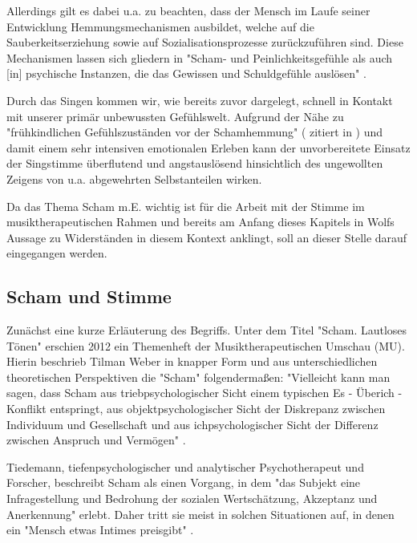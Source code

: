Allerdings gilt es dabei u.a. zu beachten, dass der Mensch im Laufe seiner Entwicklung Hemmungsmechanismen ausbildet, welche auf die Sauberkeitserziehung sowie auf Sozialisationsprozesse zurückzuführen sind. Diese Mechanismen lassen sich gliedern in "Scham- und Peinlichkeitsgefühle als auch [in] psychische Instanzen, die das Gewissen und Schuldgefühle auslösen" \autocite [106f.]{rittner1990}. 

Durch das Singen kommen wir, wie bereits zuvor dargelegt, schnell in Kontakt mit unserer primär unbewussten Gefühlswelt. Aufgrund der Nähe zu "frühkindlichen Gefühlszuständen vor der Schamhemmung" (\cite{klausmeier1978} zitiert in \cite[107]{rittner1990}) und damit einem sehr intensiven emotionalen Erleben kann der unvorbereitete Einsatz der Singstimme überflutend und angstauslösend hinsichtlich des ungewollten Zeigens von u.a. abgewehrten Selbstanteilen wirken. 

Da das Thema Scham m.E. wichtig ist für die Arbeit mit der Stimme im musiktherapeutischen Rahmen und bereits am Anfang dieses Kapitels in Wolfs Aussage zu Widerständen in diesem Kontext anklingt, soll an dieser Stelle darauf eingegangen werden.

\subsection{Scham und Stimme}
Zunächst eine kurze Erläuterung des Begriffs. Unter dem Titel "Scham. Lautloses Tönen" erschien 2012 ein Themenheft der Musiktherapeutischen Umschau (MU). Hierin beschrieb Tilman Weber in knapper Form und aus unterschiedlichen theoretischen Perspektiven die "Scham" folgendermaßen:
"Vielleicht kann man sagen, dass Scham aus triebpsychologischer Sicht einem typischen Es - Überich - Konflikt entspringt, aus objektpsychologischer Sicht der Diskrepanz zwischen Individuum und Gesellschaft und aus ichpsychologischer Sicht der Differenz zwischen Anspruch und Vermögen" \autocite[215]{weber2012}. 

Tiedemann, tiefenpsychologischer und analytischer Psychotherapeut und Forscher, beschreibt Scham als einen Vorgang, in dem "das Subjekt eine Infragestellung und Bedrohung der sozialen Wertschätzung, Akzeptanz und Anerkennung" \autocite[219]{tiedemann2012} erlebt. Daher tritt sie meist in solchen Situationen auf, in denen ein "Mensch etwas Intimes preisgibt" \autocite[219]{tiedemann2012}. 

